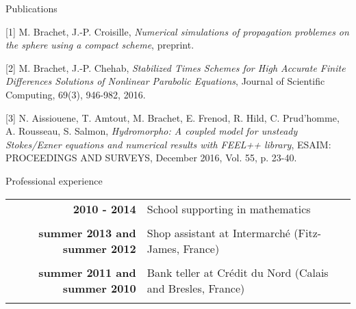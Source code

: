 \documentclass[10pt,a4paper]{report}
\begin{document}
\vspace{.4cm}
\noindent
{\selectfont
\begin{Large}
Publications
\end{Large}
\hrulefill
}
\vspace{0.5cm}

[1] {\sc  M. Brachet, J.-P. Croisille}, {\sl Numerical simulations of propagation problemes on the sphere using a compact scheme}, preprint.

\vspace{0.6cm}

[2] {\sc M. Brachet, J.-P. Chehab}, {\sl Stabilized Times Schemes for High Accurate Finite Differences Solutions of Nonlinear Parabolic Equations}, Journal of Scientific Computing, 69(3), 946-982, 2016.

\vspace{0.6cm}

[3] {\sc  N. Aissiouene, T. Amtout, M. Brachet, E. Frenod, R. Hild, C. Prud'homme, A. Rousseau, S. Salmon}, {\sl  Hydromorpho: A coupled model for unsteady Stokes/Exner equations and numerical results with FEEL++ library}, ESAIM: PROCEEDINGS AND SURVEYS, December 2016, Vol. 55, p. 23-40.






\vspace{.5cm}
\noindent
{\selectfont
\begin{Large}
Professional experience
\end{Large}
\hrulefill
}

\noindent
\begin{center}
\begin{tabular}{r p{10cm}}
\textbf{2010 - 2014} & School supporting in mathematics\\

& \\

\textbf{summer 2013 and summer 2012} & Shop assistant at Intermarché (Fitz-James, France) \\

& \\

\textbf{summer 2011 and summer 2010} & Bank teller at Crédit du Nord (Calais and Bresles, France) \\

& \\

\end{tabular}
\end{center}
\end{document}
